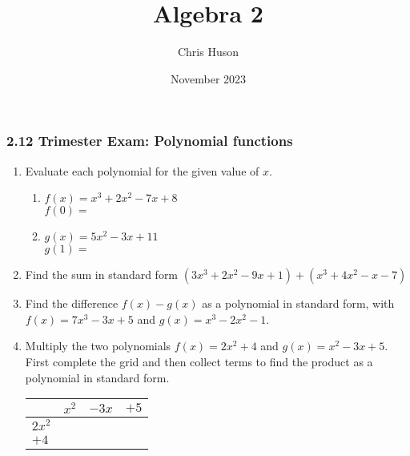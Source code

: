 \documentclass[12pt, twoside]{article}
\title{Algebra 2}
\author{Chris Huson}
\date{November 2023}
\begin{document}
\subsubsection*{2.12 Trimester Exam: Polynomial functions}
\begin{enumerate}

\subsubsection*{A1-A.APR.1 Add, subtract, and multiply polynomials}
\item Evaluate each polynomial for the given value of $x$.
\begin{multicols}{2}
    \begin{enumerate}[itemsep=1cm]
        \item $f(x)=x^3+2x^2-7x+8$\\[0.25cm] 
        $f(0) = $
        \item $g(x)=5x^2-3x+11$ \\[0.25cm] 
        $g(1) = $
    \end{enumerate}
    \end{multicols} \vspace{1cm}

\item Find the sum in standard form $(3x^3+2x^2-9x+1)+(x^3+4x^2-x-7)$ \vspace{2.5cm}

\item Find the difference $f(x)-g(x)$ as a polynomial in standard form, with \\[0.25cm]
    $f(x)=7x^3-3x+5$ and $g(x)=x^3-2x^2-1$. \vspace{3cm}

\item Multiply the two polynomials $f(x)=2x^2+4$ and $g(x)=x^2-3x+5$. First complete the grid and then collect terms to find the product as a polynomial in standard form. \\[0.25cm]
\renewcommand{\arraystretch}{2}
\begin{tabular}{|p{1cm}|p{3cm}|p{3cm}|p{3cm}|}
    \hline
     & $x^2$ & $-3x$ & $+5$ \\
    \hline
    $2x^2$ &  & & \\
    \hline
    $+4$ &  & & \\
    \hline
\end{tabular} \vspace{3cm}

\newpage

\end{enumerate}
\end{document}
